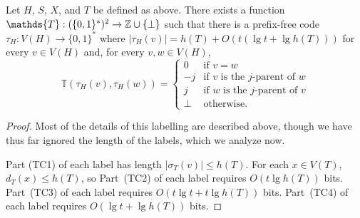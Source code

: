 \documentclass[kpfonts]{patmorin}
\let\le\leqslant
\begin{document}
\begin{lem}
  Let $H$, $S$, $X$, and $T$ be defined as above.  There exists a function $\mathds{T}:(\{0,1\}^*)^2\to \Z\cup\{\perp\}$ such that there is a prefix-free code $\tau_H:V(H)\to\{0,1\}^*$ where $|\tau_H(v)|=h(T) + O(t(\lg t + \lg h(T)))$ for every $v\in V(H)$ and, for every $v,w\in V(H)$, 
  \[
      \mathds{T}(\tau_H(v),\tau_H(w)) = \begin{cases}
      0 & \text{if $v=w$} \\
      -j & \text{if $v$ is the $j$-parent of $w$} \\
      j & \text{if $w$ is the $j$-parent of $v$} \\
      \perp & \text{otherwise.}
    \end{cases}
  \]
\end{lem}

\begin{proof}
  Most of the details of this labelling are described above, though we have thus far ignored the length of the labels, which we analyze now.
  
  Part (TC1) of each label has length $|\sigma_T(v)|\le h(T)$.  For each $x\in V(T)$, $d_T(x)\le h(T)$, so Part~(TC2) of each label requires $O(t\lg h(T))$ bits.  Part~(TC3) of each label requires $O(t\lg t + t\lg h(T))$ bits.  Part~(TC4) of each label requires $O(\lg t + \lg h(T))$ bits.
\end{proof}

% 
\end{document}
